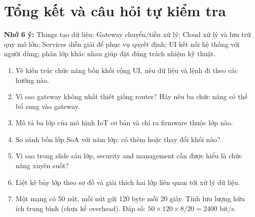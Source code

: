 \section{Tổng kết và câu hỏi tự kiểm tra}
\begin{notebox}
\textbf{Nhớ 6 ý:} Things tạo dữ liệu; Gateway chuyển/tiền xử lý; Cloud xử lý và lưu trữ quy mô lớn; Services diễn giải để phục vụ quyết định; UI kết nối hệ thống với người dùng; phân lớp khác nhau giúp đặt đúng trách nhiệm kỹ thuật.
\end{notebox}
\begin{enumerate}
\item Vẽ kiến trúc chức năng bốn khối cộng UI, nêu dữ liệu và lệnh đi theo các hướng nào.
\item Vì sao gateway không nhất thiết giống router? Hãy nêu ba chức năng có thể bổ sung vào gateway.
\item Mô tả ba lớp của mô hình IoT cơ bản và chỉ ra firmware thuộc lớp nào.
\item So sánh bốn lớp SoA với năm lớp: có thêm hoặc thay đổi khối nào?
\item Vì sao trong slide sáu lớp, security and management cần được hiểu là chức năng xuyên suốt?
\item Liệt kê bảy lớp theo sơ đồ và giải thích hai lớp liên quan tới xử lý dữ liệu.
\item Một mạng có 50 nút, mỗi nút gửi 120 byte mỗi 20 giây. Tính lưu lượng hữu ích trung bình (chưa kể overhead). Đáp số: $50\times 120\times 8/20=2400$ bit/s.
\end{enumerate}